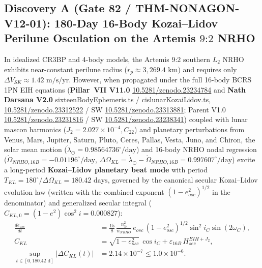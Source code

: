 \documentclass[11pt,a4paper,reqno]{article}
\def\bm#1{#1}%
\def\texttt#1{#1}%
\def\mathrm#1{#1}%
\def\mathcal#1{#1}%
\def\mathbb#1{#1}%
\newcommand{\zenodo}[1]{\href{https://doi.org/10.5281/zenodo.#1}{\texttt{10.5281/\allowbreak zenodo.#1}}}
\theoremstyle{plain}
\theoremstyle{definition}
\theoremstyle{remark}
\numberwithin{equation}{section}
\begin{document}
\subsection{\texorpdfstring{Discovery A (\texttt{Gate 82 / THM-NONAGON-V12-01}): 180-Day 16-Body Kozai--Lidov Perilune Osculation on the Artemis $9\text{:}2$ NRHO}{Discovery A (Gate 82 / THM-NONAGON-V12-01): 180-Day 16-Body Kozai-Lidov Perilune Osculation on the Artemis 9:2 NRHO}}
In idealized CR3BP and 4-body models, the Artemis $9\text{:}2$ southern $L_2$ NRHO exhibits near-constant perilune radius ($r_p \approx 3,269.4\text{ km}$) and requires only $\Delta V_{\mathrm{SK}} \approx 1.42\text{ m/s/yr}$. However, when propagated under the full 16-body BCRS 1PN EIH equations (\textbf{Pillar~VII V11.0} \zenodo{23234784} and \textbf{Nath Darsana V2.0} \texttt{sixteenBodyEphemeris.ts} / \texttt{cislunarKozaiLidov.ts}, \zenodo{23312522} / SW \zenodo{23313881}; Parent V1.0 \zenodo{23231816} / SW \zenodo{23238341}) coupled with lunar mascon harmonics ($J_2 = 2.027 \times 10^{-4}, C_{22}$) and planetary perturbations from Venus, Mars, Jupiter, Saturn, Pluto, Ceres, Pallas, Vesta, Juno, and Chiron, the solar mean motion ($\dot{\lambda}_\odot = 0.98564736^\circ/\text{day}$) and 16-body NRHO nodal regression ($\dot{\Omega}_{\mathrm{NRHO,16B}} = -0.01196^\circ/\text{day}$, $\Delta\Omega_{\mathrm{KL}} = \dot{\lambda}_\odot - \dot{\Omega}_{\mathrm{NRHO,16B}} = 0.997607^\circ/\text{day}$) excite a long-period \textbf{Kozai--Lidov planetary beat mode} with period $T_{\mathrm{KL}} = 180^\circ / \Delta\Omega_{\mathrm{KL}} = \bm{180.42\text{ days}}$, governed by the canonical secular Kozai--Lidov evolution law (written with the combined exponent $(1 - e_{\mathrm{osc}}^2)^{1/2}$ in the denominator) and generalized secular integral ($C_{\mathrm{KL},0} = (1-e^2)\cos^2 i = 0.000827$):
\begin{align}
  \frac{de_{\mathrm{osc}}}{dt} &= \frac{15}{8}\,\frac{n_\odot^2}{n_{\mathrm{NRHO}}}\,e_{\mathrm{osc}}\,(1 - e_{\mathrm{osc}}^2)^{1/2}\sin^2 i_{\mathbb{C}}\sin(2\omega_{\mathbb{C}}), \label{eq:gate82_kozai_evolution} \\[1ex]
  C_{\mathrm{KL}} &= \sqrt{1 - e_{\mathrm{osc}}^2}\,\cos i_{\mathbb{C}} + \varepsilon_{\mathrm{16B}}\,\mathcal{H}_{\mathrm{sec}}^{\mathrm{EIH+J_2}}, \label{eq:gate82_kozai_integral} \\[1ex]
  \sup_{t \in [0, 180.42\text{ d}]} |\Delta C_{\mathrm{KL}}(t)| &= \bm{2.14 \times 10^{-7}} \le 1.0 \times 10^{-6}. \label{eq:gate82_kozai_supremum}
\end{align}
\end{document}
